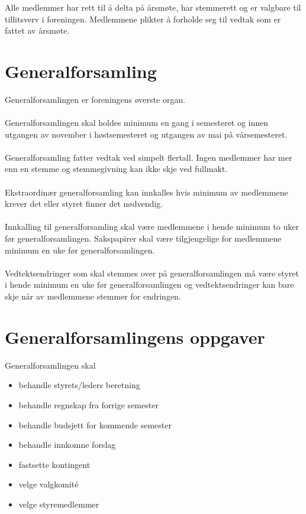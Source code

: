 \documentclass[12pt,a4paper,norsk]{article}
\begin{document}
Alle medlemmer har rett til å delta på årsmøte, har stemmerett og er valgbare til tillitsverv i
foreningen. Medlemmene plikter å forholde seg til vedtak som er fattet av årsmøte.



\section{Generalforsamling}

Generalforsamlingen er foreningens øverste organ.
\\
\\
Generalforsamlingen skal holdes minimum en gang i semesteret og innen utgangen av
november i høstsemesteret og utgangen av mai på vårsemesteret.
\\
\\
Generalforsamling fatter vedtak ved simpelt flertall. Ingen medlemmer har mer enn en stemme
og stemmegivning kan ikke skje ved fullmakt.
\\
\\
Ekstraordinær generalforsamling kan innkalles hvis minimum  av medlemmene krever det
eller styret finner det nødvendig.
\\
\\
Innkalling til generalforsamling skal være medlemmene i hende minimum to uker før
generalforsamlingen. Sakspapirer skal være tilgjengelige for medlemmene minimum en uke før
generalforsamlingen.
\\
\\
Vedtektsendringer som skal stemmes over på generalforsamlingen må være styret i hende
minimum en uke før generalforsamlingen og vedtektsendringer kan bare skje når  av
medlemmene stemmer for endringen.



\section{Generalforsamlingens oppgaver}

Generalforsamlingen skal

\begin{itemize}
    \item behandle styrets/leders beretning
    \item behandle regnskap fra forrige semester
    \item behandle budsjett for kommende semester
    \item behandle innkomne forslag
    \item fastsette kontingent
    \item velge valgkomité
    \item velge styremedlemmer
\end{itemize}
\end{document}
